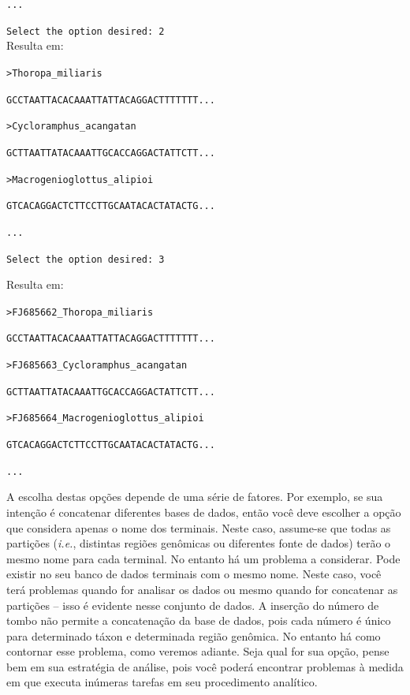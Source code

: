 \begin{refsection}
\noindent\texttt{...}\\

\normalsize


\texttt{Select the option desired: 2}\\

Resulta em:\\

\scriptsize

\noindent\texttt{>Thoropa\_miliaris}

\noindent\texttt{GCCTAATTACACAAATTATTACAGGACTTTTTTT...}

\noindent\texttt{>Cycloramphus\_acangatan}

\noindent\texttt{GCTTAATTATACAAATTGCACCAGGACTATTCTT...}

\noindent\texttt{>Macrogenioglottus\_alipioi}

\noindent\texttt{GTCACAGGACTCTTCCTTGCAATACACTATACTG...}

\noindent\texttt{...}\\

\normalsize

\texttt{Select the option desired: 3}

Resulta em:\\

\scriptsize

\noindent\texttt{>FJ685662\_Thoropa\_miliaris}

\noindent\texttt{GCCTAATTACACAAATTATTACAGGACTTTTTTT...}

\noindent\texttt{>FJ685663\_Cycloramphus\_acangatan}

\noindent\texttt{GCTTAATTATACAAATTGCACCAGGACTATTCTT...}

\noindent\texttt{>FJ685664\_Macrogenioglottus\_alipioi}

\noindent\texttt{GTCACAGGACTCTTCCTTGCAATACACTATACTG...}

\noindent\texttt{...}\\

\normalsize

A escolha destas opções depende de uma série de fatores. Por exemplo, se sua intenção é concatenar diferentes bases de dados, então você deve escolher a opção que considera apenas o nome dos terminais. Neste caso, assume-se que todas as partições (\textit{i.e.}, distintas regiões genômicas ou diferentes fonte de dados) terão o mesmo nome para cada terminal. No entanto há um problema a considerar. Pode existir no seu banco de dados terminais com o mesmo nome. Neste caso, você terá problemas quando for analisar os dados ou mesmo quando for concatenar as partições -- isso é evidente nesse conjunto de dados. A inserção do número de tombo não permite a concatenação da base de dados, pois cada número é único para determinado táxon e determinada região genômica. No entanto há como contornar esse problema, como veremos adiante. Seja qual for sua opção, pense bem em sua estratégia de análise, pois você poderá encontrar problemas à medida em que executa inúmeras tarefas em seu procedimento analítico.


\end{refsection}
